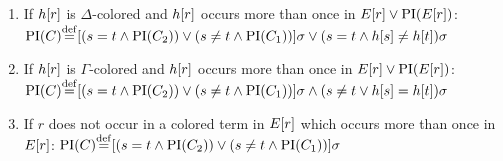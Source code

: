 \begin{defi}
\begin{itemize}
\begin{enumerate}
				\item If $h[r]$ is $\Delta$-colored and $h[r]$ occurs more than once in $E[r] \lor \operatorname{PI}(E[r])$:
					\label{def:PI_paramod_1}
					\newline
					$\PI(C) \defeq{} [ ( s=t \land \PI(C_2) ) \lor (s\neq t \land \PI(C_1)) ]\sigma \lor (s=t \land h\occur{s} \neq      h\occur{t})\sigma$
				\item If $h[r]$ is $\Gamma$-colored and $h[r]$ occurs more than once in $E[r] \lor \operatorname{PI}(E[r])$:
					\label{def:PI_paramod_2}
					\newline
					$\PI(C) \defeq{} [ ( s=t \land \PI(C_2) ) \lor (s\neq t \land \PI(C_1)) ]\sigma \land (s\neq t \lor h\occur{s} =     h\occur{t})\sigma$
				\item If $r$ does not occur in a colored term in $E[r]$ which occurs more than once in\nolinebreak{} $E[r]$:
					\label{def:PI_paramod_3}
					\newline
					$\PI(C) \defeq{} [ ( s=t \land \PI(C_2) ) \lor (s\neq t \land \PI(C_1)) ]\sigma$ \qedhere

			\end{enumerate}

	\end{itemize}
\end{defi}

